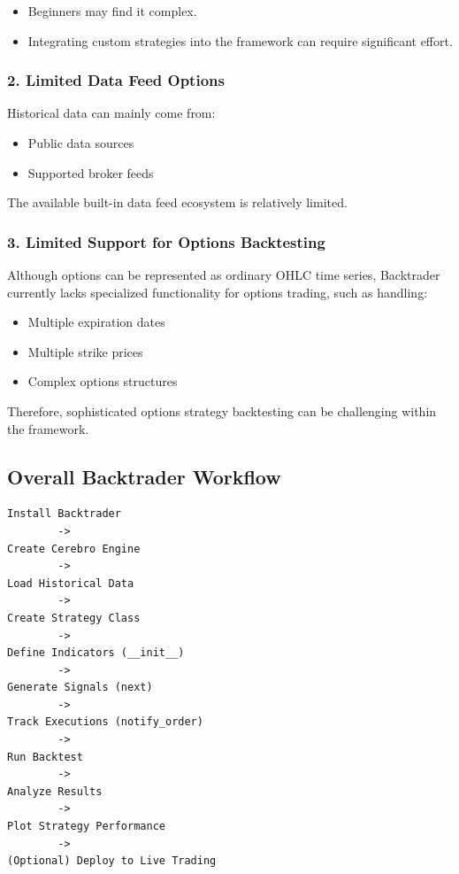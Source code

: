\documentclass[12pt,openany]{book}
\begin{document}
\begin{itemize}[leftmargin=*]
    \item Beginners may find it complex.
    \item Integrating custom strategies into the framework can require significant effort.
\end{itemize}

\subsubsection{2. Limited Data Feed Options}

Historical data can mainly come from:

\begin{itemize}[leftmargin=*]
    \item Public data sources
    \item Supported broker feeds
\end{itemize}

The available built-in data feed ecosystem is relatively limited.

\subsubsection{3. Limited Support for Options Backtesting}

Although options can be represented as ordinary OHLC time series, Backtrader currently lacks specialized functionality for options trading, such as handling:

\begin{itemize}[leftmargin=*]
    \item Multiple expiration dates
    \item Multiple strike prices
    \item Complex options structures
\end{itemize}

Therefore, sophisticated options strategy backtesting can be challenging within the framework.

\subsection{Overall Backtrader Workflow}

\begin{Verbatim}[breaklines=true,breakanywhere=true,fontsize=\small]
Install Backtrader
        ->
Create Cerebro Engine
        ->
Load Historical Data
        ->
Create Strategy Class
        ->
Define Indicators (__init__)
        ->
Generate Signals (next)
        ->
Track Executions (notify_order)
        ->
Run Backtest
        ->
Analyze Results
        ->
Plot Strategy Performance
        ->
(Optional) Deploy to Live Trading
\end{Verbatim}
\end{document}
